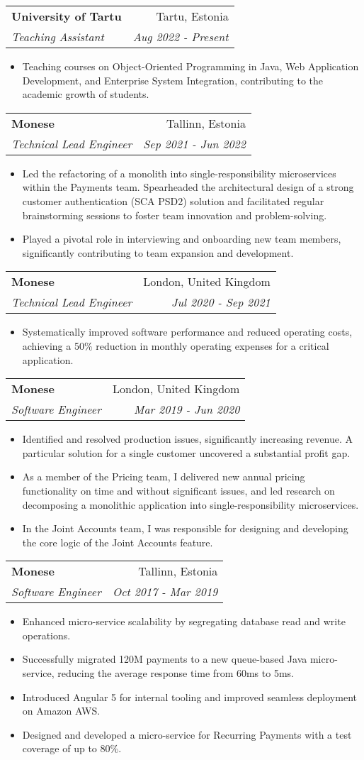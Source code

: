 \documentclass[11pt,a4paper,oneside]{report}
\makeatletter
\newcommand{\resumeItemWithoutTitle}[2]{
    \item\small{
        \textbf{#1}{#2\vspace{-2pt}}
    }
}
\newcommand{\resumeSubheading}[4]{
    \vspace{-1pt}\item
    \begin{tabular*}{0.97\textwidth}[t]{l@{\extracolsep{\fill}}r}
        \textbf{#1} & #2 \\
        \textit{\small#3} & \textit{\small #4} \\
    \end{tabular*}\vspace{-5pt}
}
\newcommand{\resumeItemListStart}{\begin{itemize}}
\newcommand{\resumeItemListEnd}{\end{itemize}\vspace{-5pt}}
\makeatother
\begin{document}
  \resumeSubheading
  {University of Tartu}{Tartu, Estonia}
  {Teaching Assistant}{Aug 2022 - Present}
      \resumeItemListStart
          \resumeItemWithoutTitle{}
          {Teaching courses on Object-Oriented Programming in Java, Web Application Development, and Enterprise System Integration, contributing to the academic growth of students.}
      \resumeItemListEnd

  \resumeSubheading
  {Monese}{Tallinn, Estonia}
  {Technical Lead Engineer}{Sep 2021 - Jun 2022}
    \resumeItemListStart
      \resumeItemWithoutTitle{}
      {Led the refactoring of a monolith into single-responsibility microservices within the Payments team. Spearheaded the architectural design of a strong customer authentication (SCA PSD2) solution and facilitated regular brainstorming sessions to foster team innovation and problem-solving.}
      \resumeItemWithoutTitle{}
      {Played a pivotal role in interviewing and onboarding new team members, significantly contributing to team expansion and development.}
    \resumeItemListEnd

  \resumeSubheading
  {Monese}{London, United Kingdom}
  {Technical Lead Engineer}{Jul 2020 - Sep 2021}
      \resumeItemListStart
          \resumeItemWithoutTitle{}
          {Systematically improved software performance and reduced operating costs, achieving a 50\% reduction in monthly operating expenses for a critical application.}
      \resumeItemListEnd

  \resumeSubheading
  {Monese}{London, United Kingdom}
  {Software Engineer}{Mar 2019 - Jun 2020}
      \resumeItemListStart
          \resumeItemWithoutTitle{}
          {Identified and resolved production issues, significantly increasing revenue. A particular solution for a single customer uncovered a substantial profit gap.}
          \resumeItemWithoutTitle{}
          {As a member of the Pricing team, I delivered new annual pricing functionality on time and without significant issues, and led research on decomposing a monolithic application into single-responsibility microservices.}
          \resumeItemWithoutTitle{}
          {In the Joint Accounts team, I was responsible for designing and developing the core logic of the Joint Accounts feature.}
      \resumeItemListEnd

  \resumeSubheading
  {Monese}{Tallinn, Estonia}
  {Software Engineer}{Oct 2017 - Mar 2019}
    \resumeItemListStart
      \resumeItemWithoutTitle{}
      {Enhanced micro-service scalability by segregating database read and write operations.}
      \resumeItemWithoutTitle{}
      {Successfully migrated 120M payments to a new queue-based Java micro-service, reducing the average response time from 60ms to 5ms.}
      \resumeItemWithoutTitle{}
      {Introduced Angular 5 for internal tooling and improved seamless deployment on Amazon AWS.}
      \resumeItemWithoutTitle{}
      {Designed and developed a micro-service for Recurring Payments with a test coverage of up to 80\%.}
    \resumeItemListEnd
\end{document}
